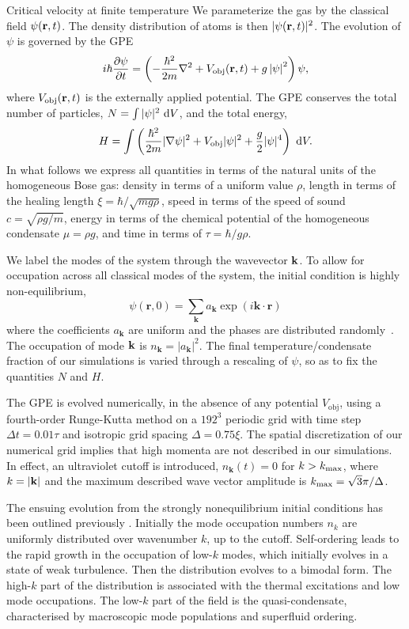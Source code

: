 \begin{chapter}{\label{cha:nonequib}Critical velocity at finite temperature}
We parameterize the gas by
the classical field $\psi({\bf r},t)$.  The density distribution of atoms
is then $|\psi({\bf r},t)|^2$. The evolution
of $\psi$ is governed by the GPE
  \begin{eqnarray}
i  \hbar \frac{\partial\psi }{\partial t}=\left( -\frac{\hbar^2}{2m}\nabla^{2} + V_{\mathrm{obj}}({\bf r},t) +g\left|\psi \right|^{2} \right ) \psi,\label{gpe}
  \end{eqnarray}
where $V_{\mathrm{obj}}({\bf r},t)$ is the externally applied potential.
The GPE conserves the total number of particles,
$N = \int |\psi|^2~{\rm d}V$, and the total energy,
\[H=\int \left(\frac{\hbar^2}{2m}|\nabla \psi|^2 + V_{\mathrm{obj}}|\psi|^2+ \frac{g}{2}|\psi|^4  \right)~{\rm d}V.\]
In what follows we express all quantities in terms of the
natural units of the homogeneous Bose gas:  density in terms of a uniform value $\rho$, length in terms of the healing length $\xi=\hbar/\sqrt{m g \rho}$, speed in terms of the speed of sound $c=\sqrt{\rho g/m}$, energy in terms of the chemical potential of the homogeneous condensate $\mu=\rho g$, and time in terms of $\tau=\hbar / g \rho$.


We label the modes of the system through the wavevector ${\bf k}$.  To allow for occupation across all classical modes of the system, the initial condition is highly non-equilibrium,
  \begin{equation}
    \psi \left(\mathbf{r},0\right)=\sum_{\mathbf{k}}a_{\mathbf k}\exp(i\mathbf{k}\cdot\mathbf{r})
    \label{eq:rand2}
  \end{equation}
where the coefficients $a_{\mathbf k}$ are uniform and the phases
are distributed randomly~\cite{PhysRevA.66.013603}.   The occupation of mode ${\bf k}$ is
$n_{\mathbf{k}}=|a_{\mathbf{k}}|^2$. The final temperature/condensate fraction of our simulations is varied through a rescaling of $\psi$, so as to fix the quantities $N$ and $H$.

The GPE is evolved numerically, in the absence of any potential $V_{\mathrm{obj}}$, using a fourth-order Runge-Kutta method on a $192^3$ periodic grid with time step $\Delta t =0.01 \tau$ and isotropic grid spacing $\Delta =0.75\xi$. The spatial discretization of our numerical grid implies that high momenta are not described in our simulations. In effect, an ultraviolet cutoff is introduced, $n_{\mathbf{k}}(t)=0$ for $k>k_{\rm{max}}$, where $k=|{\bf k}|$ and the maximum described wave vector amplitude is $k_{\rm{max}} = \sqrt{3} \pi / \Delta$. 

The ensuing evolution from the strongly nonequilibrium initial conditions has been outlined previously \cite{PhysRevA.66.013603,pattinson_2014}.  Initially the mode occupation numbers $n_k$ are uniformly distributed over wavenumber $k$, up to the cutoff.  Self-ordering leads to the rapid growth in the occupation of low-$k$ modes, which initially evolves in a state of weak turbulence.  Then the distribution evolves to a bimodal form.
The high-$k$ part of the distribution is associated with the
thermal excitations and low mode occupations.
The low-$k$ part of the field is the quasi-condensate,
characterised by macroscopic mode populations and superfluid ordering.


\end{chapter}
